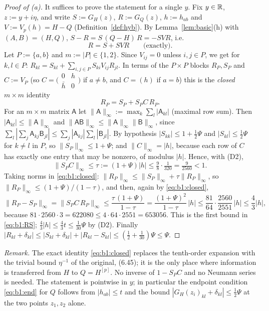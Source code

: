 \begin{proof}[Proof of \textup{(a)}]
It suffices to prove the statement for a single $y$. Fix $y\in\mathbb{R}$, $z:=y+i\eta$, and write $S:=G_H(z)$, $R:=G_Q(z)$, $h:=h_{ab}$ and
$V:=V_p(h)=H-Q$ (Definition~\ref{def:hyb}). By Lemma~\ref{lem:basic}(h) with $(A,B)=(H,Q)$, $S-R=S\,(Q-H)\,R=-SVR$, i.e.
\[
R=S+SVR\qquad\text{(exactly)}.
\]
Let $P:=\{a,b\}$ and $m:=|P|\in\{1,2\}$. Since $V_{ij}=0$ unless $i,j\in P$, we get for $k,l\in P$: $R_{kl}=S_{kl}+\sum_{i,j\in P}S_{ki}V_{ij}R_{jl}$.
In terms of the $P\times P$ blocks $R_P,S_P$ and $C:=V_P$ (so $C=\big(\begin{smallmatrix}0&h\\ \bar h&0\end{smallmatrix}\big)$ if $a\ne b$, and $C=(h)$ if $a=b$)
this is the \emph{closed} $m\times m$ identity
\begin{equation}\label{eq:b1:closed}
R_P=S_P+S_PC\,R_P .
\end{equation}
For an $m\times m$ matrix $\mathsf A$ let $\|\mathsf A\|_\infty:=\max_k\sum_l|\mathsf A_{kl}|$ (maximal row sum). Then $|\mathsf A_{kl}|\le\|\mathsf A\|_\infty$ and
$\|\mathsf A\mathsf B\|_\infty\le\|\mathsf A\|_\infty\|\mathsf B\|_\infty$, since $\sum_l|\sum_j\mathsf A_{kj}\mathsf B_{jl}|\le\sum_j|\mathsf A_{kj}|\sum_l|\mathsf B_{jl}|$.
By hypothesis $|S_{kk}|\le1+\frac12\Psi$ and $|S_{kl}|\le\frac12\Psi$ for $k\ne l$ in $P$, so $\|S_P\|_\infty\le1+\Psi$; and $\|C\|_\infty=|h|$, because each row
of $C$ has exactly one entry that may be nonzero, of modulus $|h|$. Hence, with \textup{(D2)},
\[
\|S_PC\|_\infty\le\tau:=(1+\Psi)|h|\le\tfrac98\cdot\tfrac1{320}=\tfrac{9}{2560}<1 .
\]
Taking norms in \eqref{eq:b1:closed}: $\|R_P\|_\infty\le\|S_P\|_\infty+\tau\|R_P\|_\infty$, so $\|R_P\|_\infty\le(1+\Psi)/(1-\tau)$, and then, again by \eqref{eq:b1:closed},
\[
\|R_P-S_P\|_\infty=\|S_PC\,R_P\|_\infty\le\frac{\tau\,(1+\Psi)}{1-\tau}=\frac{(1+\Psi)^2}{1-\tau}\,|h|\le\frac{81}{64}\cdot\frac{2560}{2551}\,|h|\le\frac43|h| ,
\]
because $81\cdot2560\cdot3=622080\le4\cdot64\cdot2551=653056$. This is the first bound in \eqref{eq:b1:RS}; $\frac43|h|\le\frac43t\le\frac1{30}\Psi$ by \textup{(D2)}.
Finally $|R_{kl}+\delta_{kl}|\le|S_{kl}+\delta_{kl}|+|R_{kl}-S_{kl}|\le(\frac12+\frac1{30})\Psi\le\Psi$.
\end{proof}
\noindent\emph{Remark.} The exact identity \eqref{eq:b1:closed} replaces the tenth-order expansion with the trivial bound $\eta^{-1}$ of the original, (6.45);
it is the only place where information is transferred from $H$ to $Q=H^{[p]}$. No inverse of $1-S_PC$ and no Neumann series is needed.
The statement is pointwise in $y$; in particular the endpoint condition \eqref{eq:b1:end} for $Q$ follows from $|h_{ab}|\le t$ and the bound
$|G_H(z_i)_{kl}+\delta_{kl}|\le\frac12\Psi$ at the two points $z_1,z_2$ alone.

